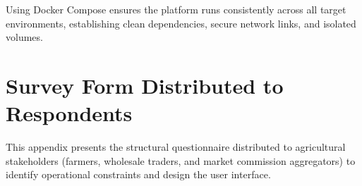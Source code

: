 \documentclass[12pt,a4paper]{report}
\theoremstyle{definition}
\theoremstyle{remark}
\begin{document}
Using Docker Compose ensures the platform runs consistently across all target environments, establishing clean dependencies, secure network links, and isolated volumes.

\chapter{Survey Form Distributed to Respondents}
\label{appendix:survey}

This appendix presents the structural questionnaire distributed to agricultural stakeholders (farmers, wholesale traders, and market commission aggregators) to identify operational constraints and design the user interface.
\end{document}
